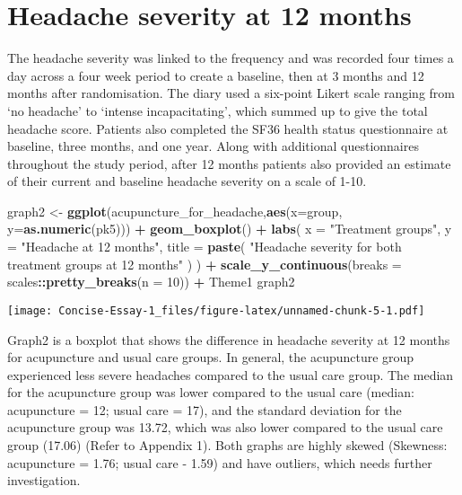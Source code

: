 \documentclass[
]{article}
\newenvironment{Shaded}{\begin{snugshade}}{\end{snugshade}}
\newcommand{\DataTypeTok}[1]{\textcolor[rgb]{0.13,0.29,0.53}{#1}}
\newcommand{\DecValTok}[1]{\textcolor[rgb]{0.00,0.00,0.81}{#1}}
\newcommand{\KeywordTok}[1]{\textcolor[rgb]{0.13,0.29,0.53}{\textbf{#1}}}
\newcommand{\NormalTok}[1]{#1}
\newcommand{\OperatorTok}[1]{\textcolor[rgb]{0.81,0.36,0.00}{\textbf{#1}}}
\newcommand{\StringTok}[1]{\textcolor[rgb]{0.31,0.60,0.02}{#1}}
\begin{document}
\hypertarget{headache-severity-at-12-months}{%
\section{Headache severity at 12
months}\label{headache-severity-at-12-months}}

The headache severity was linked to the frequency and was recorded four
times a day across a four week period to create a baseline, then at 3
months and 12 months after randomisation. The diary used a six-point
Likert scale ranging from `no headache' to `intense incapacitating',
which summed up to give the total headache score. Patients also
completed the SF36 health status questionnaire at baseline, three
months, and one year. Along with additional questionnaires throughout
the study period, after 12 months patients also provided an estimate of
their current and baseline headache severity on a scale of 1-10.

\begin{Shaded}
\begin{Highlighting}[]
\NormalTok{graph2 <-}\StringTok{ }\KeywordTok{ggplot}\NormalTok{(acupuncture_for_headache,}\KeywordTok{aes}\NormalTok{(}\DataTypeTok{x=}\NormalTok{group,  }\DataTypeTok{y=}\KeywordTok{as.numeric}\NormalTok{(pk5))) }\OperatorTok{+}
\StringTok{  }\KeywordTok{geom_boxplot}\NormalTok{() }\OperatorTok{+}
\StringTok{  }\KeywordTok{labs}\NormalTok{(}
    \DataTypeTok{x =} \StringTok{"Treatment groups"}\NormalTok{,}
    \DataTypeTok{y =} \StringTok{"Headache at 12 months"}\NormalTok{,}
    \DataTypeTok{title =} \KeywordTok{paste}\NormalTok{(}
      \StringTok{"Headache severity for both treatment groups at 12 months"}
\NormalTok{    )}
\NormalTok{  ) }\OperatorTok{+}
\StringTok{  }\KeywordTok{scale_y_continuous}\NormalTok{(}\DataTypeTok{breaks =}\NormalTok{ scales}\OperatorTok{::}\KeywordTok{pretty_breaks}\NormalTok{(}\DataTypeTok{n =} \DecValTok{10}\NormalTok{)) }\OperatorTok{+}
\StringTok{  }\NormalTok{Theme1}
\NormalTok{graph2}
\end{Highlighting}
\end{Shaded}

\texttt{[image: Concise-Essay-1\_files/figure-latex/unnamed-chunk-5-1.pdf]}

Graph2 is a boxplot that shows the difference in headache severity at 12
months for acupuncture and usual care groups. In general, the
acupuncture group experienced less severe headaches compared to the
usual care group. The median for the acupuncture group was lower
compared to the usual care (median: acupuncture = 12; usual care = 17),
and the standard deviation for the acupuncture group was 13.72, which
was also lower compared to the usual care group (17.06) (Refer to
Appendix 1). Both graphs are highly skewed (Skewness: acupuncture =
1.76; usual care - 1.59) and have outliers, which needs further
investigation.
\end{document}
